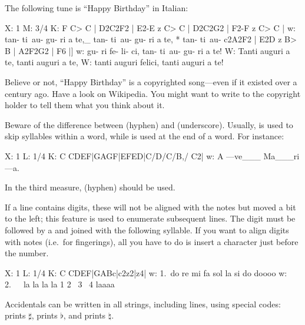 \documentclass[a4paper,fullpage,12pt]{book}
\begin{document}
The following tune is ``Happy Birthday'' in Italian:

\begin{abcsource}
X: 1
M: 3/4
K: F
C> C | D2C2F2 | E2-E z C> C | D2C2G2 | F2-F z C> C |
w: tan- ti~au- gu- ri a te,_ tan- ti~au- gu- ri a te, * tan- ti~au-
c2A2F2 | E2D z B> B | A2F2G2 | F6 |]
w: gu- ri fe- li- ci, tan- ti~au- gu- ri a te!
%
W: Tanti auguri a te, tanti auguri a te,
W: tanti auguri felici, tanti auguri a te!
\end{abcsource}


\begin{note}
  
  Believe or not, ``Happy Birthday'' is a copyrighted song---even if
  it existed over a century ago. Have a look on Wikipedia. You might
  want to write to the copyright holder to tell them what you think
  about it.
  
\end{note}

Beware of the difference between \car{-} (hyphen) and \car{\_}
(underscore). Usually, \car{-} is used to skip syllables within a
word, while \car{\_} is used at the end of a word. For instance:

\begin{abcsource}
X: 1
L: 1/4
K: C
CDEF|GAGF|EFED|C/D/C/B,/ C2|
w: A ---ve___ Ma___ri ---a.
\end{abcsource}


In the third measure, \car{-} (hyphen) should be used.

If a  line contains digits, these will not be aligned with
the notes but moved a bit to the left; this feature is used to
enumerate subsequent  lines. The digit must be followed by a
\car{\textasciitilde} and joined with the following syllable. If you
want to align digits with notes (i.e.\ for fingerings), all you have
to do is insert a \car{\textasciitilde} character just before the
number.

\begin{abcsource}
X: 1
L: 1/4
K: C
CDEF|GABc|c2z2|z4|
w: 1.~do re mi fa sol la si do doooo
w: 2.~~~la la la la 1 2 ~3 ~4 laaaa
\end{abcsource}


Accidentals can be written in all strings, including  lines,
using special codes:  prints $\sharp$,  prints
$\flat$, and  prints $\natural$.
\end{document}

